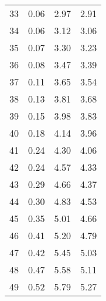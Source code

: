 \begin{longtable}[c]{cccc}
	33                       & 0.06                                 & 2.97                                 & 2.91                       \\
	34                       & 0.06                                 & 3.12                                 & 3.06                       \\
	35                       & 0.07                                 & 3.30                                 & 3.23                       \\
	36                       & 0.08                                 & 3.47                                 & 3.39                       \\
	37                       & 0.11                                 & 3.65                                 & 3.54                       \\
	38                       & 0.13                                 & 3.81                                 & 3.68                       \\
	39                       & 0.15                                 & 3.98                                 & 3.83                       \\
	40                       & 0.18                                 & 4.14                                 & 3.96                       \\
	41                       & 0.24                                 & 4.30                                 & 4.06                       \\
	42                       & 0.24                                 & 4.57                                 & 4.33                       \\
	43                       & 0.29                                 & 4.66                                 & 4.37                       \\
	44                       & 0.30                                 & 4.83                                 & 4.53                       \\
	45                       & 0.35                                 & 5.01                                 & 4.66                       \\
	46                       & 0.41                                 & 5.20                                 & 4.79                       \\
	47                       & 0.42                                 & 5.45                                 & 5.03                       \\
	48                       & 0.47                                 & 5.58                                 & 5.11                       \\
	49                       & 0.52                                 & 5.79                                 & 5.27                       \\

\end{longtable}

